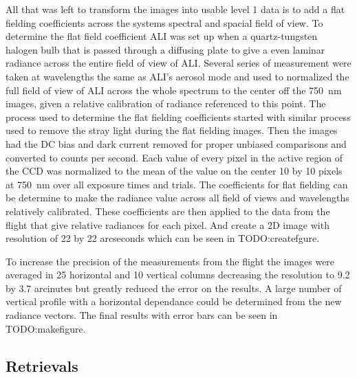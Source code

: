 \documentclass[12pt]{article}
\begin{document}
All that was left to transform the images into usable level 1 data is to add a flat fielding coefficients across the systems spectral and spacial field of view. To determine the flat field coefficient ALI was set up when a quartz-tungsten halogen bulb that is passed through a diffusing plate to give a even laminar radiance across the entire field of view of ALI. Several series of measurement were taken at wavelengths the same as ALI's aerosol mode and used to normalized the full field of view of ALI across the whole spectrum to the center off the 750~nm images, given a relative calibration of radiance referenced to this point. The process used to determine the flat fielding coefficients started with similar process used to remove the stray light during the flat fielding images. Then the images had the DC bias and dark current removed for proper unbiased comparisons and converted to counts per second. Each value of every pixel in the active region of the CCD was normalized to the mean of the value on the center 10 by 10 pixels at 750~nm over all exposure times and trials. The coefficients for flat fielding can be determine to make the radiance value across all field of views and wavelengths relatively calibrated. These coefficients are then applied to the data from the flight that give relative radiances for each pixel. And create a 2D image with resolution of 22 by 22 arcseconds which can be seen in TODO:createfgure.

To increase the precision of the measurements from the flight the images were averaged in 25 horizontal and 10 vertical columns decreasing the resolution to 9.2 by 3.7 arcinutes but greatly reduced the error on the results. A large number of vertical profile with a horizontal dependance could be determined from the new radiance vectors. The final results with error bars can be seen in TODO:makefigure.

\subsection{Retrievals}
\end{document}
